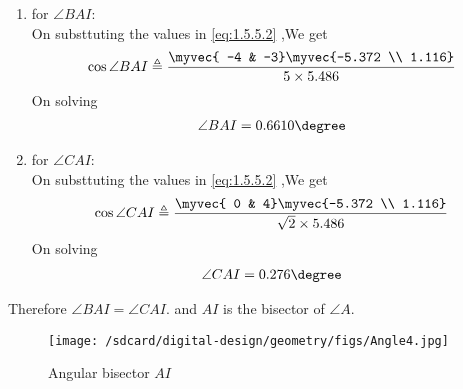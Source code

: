 \documentclass[11pt]{book}
\begin{document}
\begin{enumerate}[label=\thesection.\arabic*.,ref=\thesection.\theenumi]
\begin{enumerate}
    \item for $\angle BAI$: \\
    On substtuting the values in  \eqref{eq:1.5.5.2} ,We get 
    \begin{align}
        \cos{\angle BAI} \triangleq \frac{\myvec{ -4 & -3}\myvec{-5.372 \\ 1.116}}{ 5\times 5.486} \\
    \end{align}
    On solving 
    \begin{align}
        \angle BAI = 0.6610 \degree
    \end{align}
       \item for $\angle CAI$: \\
    On substtuting the values in  \eqref{eq:1.5.5.2} ,We get 
    \begin{align}
        \cos{\angle CAI} \triangleq \frac{\myvec{ 0 & 4}\myvec{-5.372 \\ 1.116}}{ \sqrt{2} \times 5.486} \\
    \end{align}
    On solving 
    \begin{align}
        \angle CAI = 0.276 \degree
    \end{align}
\end{enumerate}
Therefore $\angle BAI = \angle CAI.$ and $AI$ is the bisector of $\angle A$. 
\begin{figure}[H]
    \centering
    \texttt{[image: /sdcard/digital-design/geometry/figs/Angle4.jpg]}
    \caption{Angular bisector  $AI$}
    \label{fig:Ang_bisect4}
\end{figure}



\end{enumerate}
\end{document}
